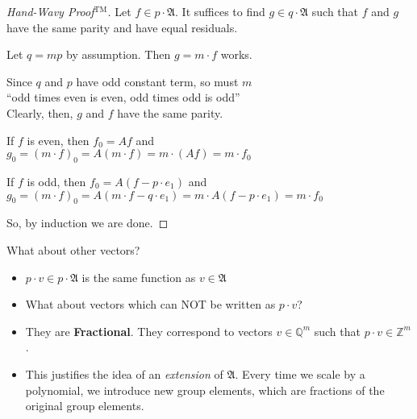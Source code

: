 \documentclass{beamer}
\newcommand{\2}{\textbf{2}}
\newcommand{\Z}{\mathbb{Z}}
\newcommand{\Q}{\mathbb{Q}}
\newcommand{\p}{\mathfrak{A}}
\begin{document}
\begin{frame}
  \begin{proof}[Hand-Wavy Proof$^{\text{TM}}$]
    Let $f \in p \cdot \p$. It suffices to find $g \in q \cdot \p$
    such that $f$ and $g$ have the same parity and have equal
    residuals.

    \bigskip

    Let $q = mp$ by assumption. Then $g = m \cdot f$ works.

    \bigskip

    Since $q$ and $p$ have odd constant term, so must $m$\\
    ``odd times even is even, odd times odd is odd''\\
    Clearly, then, $g$ and $f$ have the same parity.

    \bigskip

    If $f$ is even, then $f_0 = Af$ and\\
    $g_0 = (m \cdot f)_0 = A(m \cdot f) = m \cdot (Af) = m \cdot f_0$

    \bigskip

    If $f$ is odd, then $f_0 = A(f - p \cdot e_1)$ and\\
    $g_0 = (m \cdot f)_0 = A(m \cdot f - q \cdot e_1) = m \cdot A(f - p \cdot e_1) = m \cdot f_0$

    \bigskip

    So, by induction we are done.
  \end{proof}
\end{frame}

\begin{frame}{What about other vectors?}
  \begin{itemize}
    \item $p \cdot v \in p \cdot \p$ is the same function as $v \in \p$
    \item What about vectors which can NOT be written as $p \cdot v$?
    \item They are \textbf{Fractional}. They correspond to 
          vectors $v \in \Q^m$ such that $p \cdot v \in \Z^m$. 
    \item This justifies the idea of an \emph{extension} of $\p$. 
          Every time we scale by a polynomial, we introduce new group
          elements, which are fractions of the original group elements.
  \end{itemize}
\end{frame}
\end{document}
